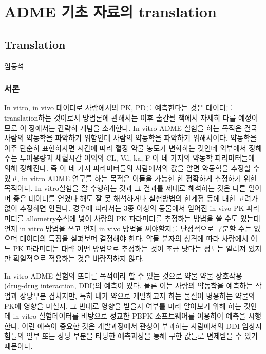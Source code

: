 \documentclass[
  11pt,
  krantz2, a4paper, twoside]{krantz}
\begin{document}
\hypertarget{part-adme-uxae30uxcd08-uxc790uxb8ccuxc758-translation}{%
\part{ADME 기초 자료의 translation}\label{part-adme-uxae30uxcd08-uxc790uxb8ccuxc758-translation}}

\hypertarget{translation}{%
\chapter{Translation}\label{translation}}

\Large\hfill

임동석
\normalsize

\hypertarget{uxc11cuxb860-7}{%
\section{서론}\label{uxc11cuxb860-7}}

In vitro, in vivo 데이터로 사람에서의 PK, PD를 예측한다는 것은 데이터를 translation하는 것이로서 방법론에 관해서는 이후 출간될 책에서 자세히 다룰 예정이므로 이 장에서는 간략히 개념을 소개한다.
In vitro ADME 실험을 하는 목적은 결국 사람의 약동학을 파악하기 위함인데 사람의 약동학을 파악하기 위해서이다.
약동학을 아주 단순히 표현하자면 시간에 따라 혈장 약물 농도가 변화하는 것인데 외부에서 정해주는 투여용량과 채혈시간 이외의 CL, Vd, ka, F 이 네 가지의 약동학 파라미터들에 의해 정해진다.
즉 이 네 가지 파라미터들의 사람에서의 값을 알면 약동학을 추정할 수 있고, in vitro ADME 연구를 하는 목적은 이들을 가능한 한 정확하게 추정하기 위한 목적이다.
In vitro실험을 잘 수행하는 것과 그 결과를 제대로 해석하는 것은 다른 일이며 좋은 데이터를 얻었다 해도 잘 못 해석하거나 실험방법의 한계점 등에 대한 고려가 없이 추정하면 안된다.
경우에 따라서는 3종 이상의 동물에서 얻어진 in vivo PK 파라미터를 allometry수식에 넣어 사람의 PK 파라미터를 추정하는 방법을 쓸 수도 있는데 언제 in vitro 방법을 쓰고 언제 in vivo 방법을 써야할지를 단정적으로 구분할 수는 없으며 데이터의 특징을 살펴보며 결정해야 한다.
약물 분자의 성격에 따라 사람에서 어느 PK 파라미터는 대략 어떤 방법으로 추정하는 것이 조금 낫다는 정도는 알려져 있지만 획일적으로 적용하는 것은 바람직하지 않다.

In vitro ADME 실험의 또다른 목적이라 할 수 있는 것으로 약물-약물 상호작용 (drug-drug interaction, DDI)의 예측이 있다.
물론 이는 사람의 약동학을 예측하는 작업과 상당부분 겹치지만, 특히 내가 약으로 개발하고자 하는 물질이 병용하는 약물의 PK에 영향을 미칠지, 그 반대로 영향을 받을지 여부를 미리 알아보기 위해 하는 것인데 in vitro 실험데이터를 바탕으로 정교한 PBPK 소프트웨어를 이용하여 예측을 시행한다.
이런 예측이 중요한 것은 개발과정에서 관청이 부과하는 사람에서의 DDI 임상시험들의 일부 또는 상당 부분을 타당한 예측과정을 통해 구한 값들로 면제받을 수 있기 때문이다.
\end{document}
